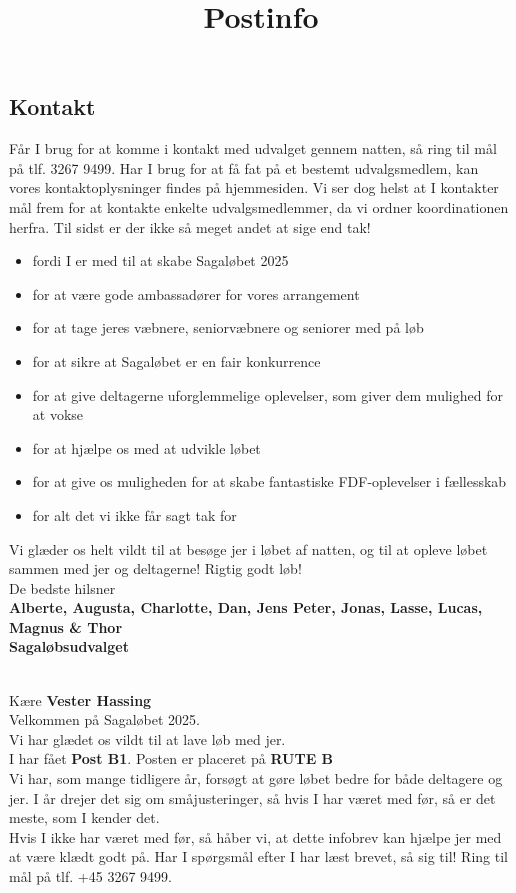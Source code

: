 \subsection{Kontakt}
Får I brug for at komme i kontakt med udvalget gennem natten, så ring til mål på tlf. 3267 9499. Har I brug for at få fat på et bestemt udvalgsmedlem, kan vores kontaktoplysninger findes på hjemmesiden. Vi ser dog helst at I kontakter mål frem for at kontakte enkelte udvalgsmedlemmer, da vi ordner koordinationen herfra.
\newline
Til sidst er der ikke så meget andet at sige end tak!\begin{itemize}
  \item fordi I er med til at skabe Sagaløbet 2025
  \item for at være gode ambassadører for vores arrangement
  \item for at tage jeres væbnere, seniorvæbnere og seniorer med på løb
  \item for at sikre at Sagaløbet er en fair konkurrence
  \item for at give deltagerne uforglemmelige oplevelser, som giver dem mulighed for at vokse
  \item for at hjælpe os med at udvikle løbet
  \item for at give os muligheden for at skabe fantastiske FDF-oplevelser i fællesskab
  \item for alt det vi ikke får sagt tak for
\end{itemize}
Vi glæder os helt vildt til at besøge jer i løbet af natten, og til at opleve løbet sammen med jer og deltagerne!
\newline
Rigtig godt løb!\\
\newline
\textcolor{søblå}{De bedste hilsner}\\
\textcolor{natblå}{\textbf{Alberte, Augusta, Charlotte, Dan, Jens Peter, Jonas, Lasse, Lucas, Magnus \& Thor}}\\
\textcolor{natblå}{\textbf{Sagaløbsudvalget}}\\
\newpage
\title{Postinfo}\\
Kære \textbf{Vester Hassing}\\
\newline
Velkommen på Sagaløbet 2025.\\
Vi har glædet os vildt til at lave løb med jer.\\
\newline
I har fået \textbf{Post B1}. Posten er placeret på \textbf{RUTE B}\\
Vi har, som mange tidligere år, forsøgt at gøre løbet bedre for både deltagere og jer. I år drejer det sig om småjusteringer, så hvis I har været med før, så er det meste, som I kender det.\\
\newline
Hvis I ikke har været med før, så håber vi, at dette infobrev kan hjælpe jer med at være klædt godt på. Har I spørgsmål efter I har læst brevet, så sig til! Ring til mål på tlf. +45 3267 9499.
